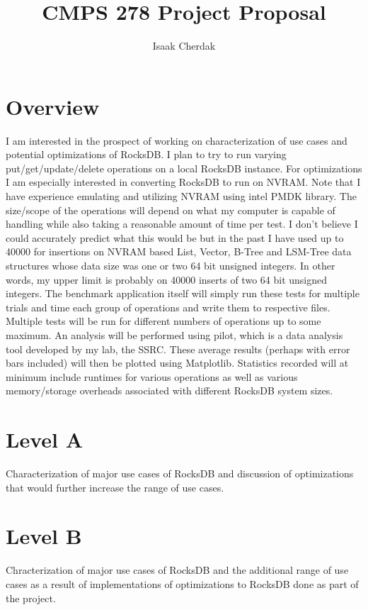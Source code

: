 \documentclass{article}
\title{CMPS 278 Project Proposal}
\author{Isaak Cherdak}
\begin{document}
\maketitle

\pagebreak

\section*{Overview}

I am interested in the prospect of working on characterization of use cases and
potential optimizations of RocksDB. I plan to try to run varying
put/get/update/delete operations on a local RocksDB instance. For optimizations
I am especially interested in converting RocksDB to run on NVRAM. Note that I
have experience emulating and utilizing NVRAM using intel PMDK library. The
size/scope of the operations will depend on what my computer is capable of
handling while also taking a reasonable amount of time per test. I don't believe
I could accurately predict what this would be but in the past I have used up to
40000 for insertions on NVRAM based List, Vector, B-Tree and LSM-Tree data
structures whose data size was one or two 64 bit unsigned integers. In other
words, my upper limit is probably on 40000 inserts of two 64 bit unsigned
integers. The benchmark application itself will simply run these tests for
multiple trials and time each group of operations and write them to respective
files. Multiple tests will be run for different numbers of operations up to some
maximum. An analysis will be performed using pilot, which is a data analysis
tool developed by my lab, the SSRC. These average results (perhaps with error
bars included) will then be plotted using Matplotlib. Statistics recorded will
at minimum include runtimes for various operations as well as various
memory/storage overheads associated with different RocksDB system sizes.

\section*{Level A}

Characterization of major use cases of RocksDB and discussion of optimizations
that would further increase the range of use cases.

\section*{Level B}

Chracterization of major use cases of RocksDB and the additional range of use
cases as a result of implementations of optimizations to RocksDB done as part of
the project.
\end{document}
